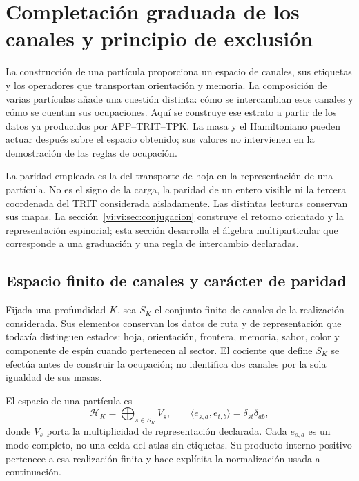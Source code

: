 \section{Completación graduada de los canales y principio de exclusión}
\label{vi:vi:sec:fock-pauli}

La construcción de una partícula proporciona un espacio de canales, sus
etiquetas y los operadores que transportan orientación y memoria. La
composición de varias partículas añade una cuestión distinta: cómo se
intercambian esos canales y cómo se cuentan sus ocupaciones. Aquí se
construye ese estrato a partir de los datos ya producidos por
APP--TRIT--TPK. La masa y el Hamiltoniano pueden actuar después sobre
el espacio obtenido; sus valores no intervienen en la demostración de
las reglas de ocupación.

La paridad empleada es la del transporte de hoja en la representación
de una partícula. No es el signo de la carga, la paridad de un entero
visible ni la tercera coordenada del TRIT considerada aisladamente.
Las distintas lecturas conservan sus mapas. La
sección~\ref{vi:vi:sec:conjugacion} construye el retorno orientado y la
representación espinorial; esta sección desarrolla el álgebra
multiparticular que corresponde a una graduación y una regla de
intercambio declaradas.

\subsection{Espacio finito de canales y carácter de paridad}
\label{vi:vi:subsec:canales-graduados}

Fijada una profundidad \(K\), sea \(S_K\) el conjunto finito de
canales de la realización considerada. Sus elementos conservan los
datos de ruta y de representación que todavía distinguen estados:
hoja, orientación, frontera, memoria, sabor, color y componente de
espín cuando pertenecen al sector. El cociente que define \(S_K\)
se efectúa antes de construir la ocupación; no identifica dos canales
por la sola igualdad de sus masas.

El espacio de una partícula es
\begin{equation}
 \mathcal H_K=\bigoplus_{s\in S_K}V_s,
 \qquad\langle e_{s,a},e_{t,b}\rangle=\delta_{st}\delta_{ab},
 \label{vi:vi:eq:espacio-canales-fock}
\end{equation}
donde \(V_s\) porta la multiplicidad de representación declarada.
Cada \(e_{s,a}\) es un modo completo, no una celda del atlas sin
etiquetas. Su producto interno positivo pertenece a esa realización
finita y hace explícita la normalización usada a continuación.

